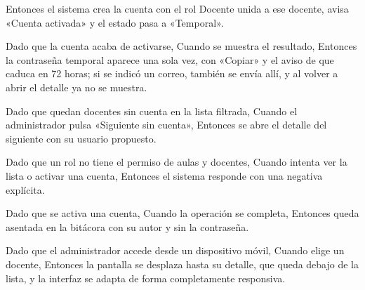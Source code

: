 {      Entonces el sistema crea la cuenta con el rol Docente unida a ese docente, avisa
      «Cuenta activada» y el estado pasa a «Temporal».
\item Dado que la cuenta acaba de activarse, Cuando se muestra el resultado, Entonces la
      contraseña temporal aparece una sola vez, con «Copiar» y el aviso de que caduca en
      72 horas; si se indicó un correo, también se envía allí, y al volver a abrir el
      detalle ya no se muestra.
\item Dado que quedan docentes sin cuenta en la lista filtrada, Cuando el administrador
      pulsa «Siguiente sin cuenta», Entonces se abre el detalle del siguiente con su
      usuario propuesto.
\item Dado que un rol no tiene el permiso de aulas y docentes, Cuando intenta ver la
      lista o activar una cuenta, Entonces el sistema responde con una negativa
      explícita.
\item Dado que se activa una cuenta, Cuando la operación se completa, Entonces queda
      asentada en la bitácora con su autor y sin la contraseña.
\item Dado que el administrador accede desde un dispositivo móvil, Cuando elige un
      docente, Entonces la pantalla se desplaza hasta su detalle, que queda debajo de la
      lista, y la interfaz se adapta de forma completamente responsiva.}

\def\HUPruebas{%
\item \texttt{DocentesTest}: lista por nombre con facultades y estado de la cuenta,
      paginación y filtros por facultad, sin cuenta, más de una facultad y nombre
      (criterios 1 a 5).
\item \texttt{DocentesTest}: detalle con las materias por facultad y la cuenta, usuario
      propuesto libre y cuenta con contraseña temporal (criterios 6 a 8).
\item \texttt{ProponerUsuarioTest}: nombre de pila, punto y apellido paterno, y sufijo
      numérico cuando el usuario está tomado (criterio 8).
\item \texttt{DocentesTest}: validación del usuario y del correo, usuario o correo en
      uso, y docente que ya tiene cuenta (criterios 7, 9 y 10).
\item \texttt{DocentesTest} y \texttt{ContrasenaTemporalTest}: la activación devuelve la
      contraseña temporal una sola vez y une la cuenta al docente, la envía si hay
      correo y vence a las 72 horas (criterios 11 y 12).
\item \texttt{DocentesTest}: sin sesión, rol sin permiso, docente inexistente y asiento
      en la bitácora (criterios 14 y 15).
\item \texttt{Docentes.test.jsx} (por escribir): filtros, detalle, formulario con sus
      errores, contraseña mostrada una vez con «Copiar» y «Siguiente sin cuenta»
      (criterios 2 a 6, 9, 12, 13 y 16).}


